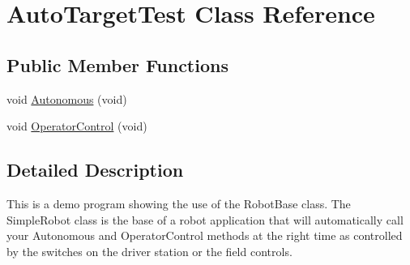 \hypertarget{class_auto_target_test}{\section{Auto\-Target\-Test Class Reference}
\label{class_auto_target_test}
}
\subsection*{Public Member Functions}
\begin{DoxyCompactItemize}
\item 
void \hyperlink{class_auto_target_test_a718386ba75b9472eb51a78a63c1eb8fd}{Autonomous} (void)
\item 
void \hyperlink{class_auto_target_test_a530cef7a8526676787341aebd9f60314}{Operator\-Control} (void)
\end{DoxyCompactItemize}


\subsection{Detailed Description}
This is a demo program showing the use of the Robot\-Base class. The Simple\-Robot class is the base of a robot application that will automatically call your Autonomous and Operator\-Control methods at the right time as controlled by the switches on the driver station or the field controls. 

